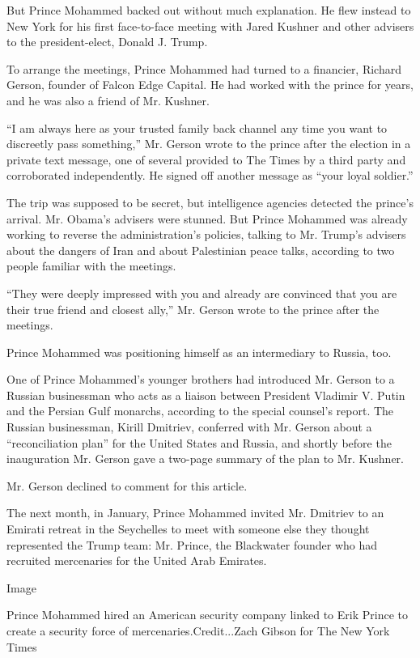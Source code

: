 But Prince Mohammed backed out without much explanation. He flew instead
to New York for his first face-to-face meeting with Jared Kushner and
other advisers to the president-elect, Donald J. Trump.

To arrange the meetings, Prince Mohammed had turned to a financier,
Richard Gerson, founder of Falcon Edge Capital. He had worked with the
prince for years, and he was also a friend of Mr. Kushner.

``I am always here as your trusted family back channel any time you want
to discreetly pass something,'' Mr. Gerson wrote to the prince after the
election in a private text message, one of several provided to The Times
by a third party and corroborated independently. He signed off another
message as ``your loyal soldier.''

The trip was supposed to be secret, but intelligence agencies detected
the prince's arrival. Mr. Obama's advisers were stunned. But Prince
Mohammed was already working to reverse the administration's policies,
talking to Mr. Trump's advisers about the dangers of Iran and about
Palestinian peace talks, according to two people familiar with the
meetings.

``They were deeply impressed with you and already are convinced that you
are their true friend and closest ally,'' Mr. Gerson wrote to the prince
after the meetings.

Prince Mohammed was positioning himself as an intermediary to Russia,
too.

One of Prince Mohammed's younger brothers had introduced Mr. Gerson to a
Russian businessman who acts as a liaison between President Vladimir V.
Putin and the Persian Gulf monarchs, according to the special counsel's
report. The Russian businessman, Kirill Dmitriev, conferred with Mr.
Gerson about a ``reconciliation plan'' for the United States and Russia,
and shortly before the inauguration Mr. Gerson gave a two-page summary
of the plan to Mr. Kushner.

Mr. Gerson declined to comment for this article.

The next month, in January, Prince Mohammed invited Mr. Dmitriev to an
Emirati retreat in the Seychelles to meet with someone else they thought
represented the Trump team: Mr. Prince, the Blackwater founder who had
recruited mercenaries for the United Arab Emirates.

Image

Prince Mohammed hired an American security company linked to Erik Prince
to create a security force of mercenaries.Credit...Zach Gibson for The
New York Times

